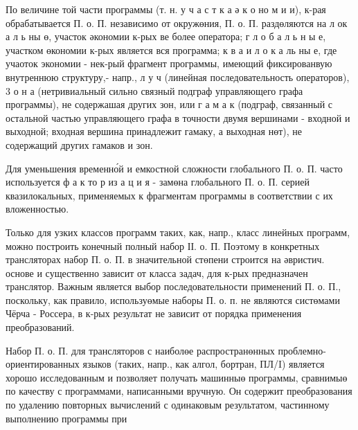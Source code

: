 \documentclass[10pt]{article}
\begin{document}
По величине той части программы (т. н. у ч а с т к а ә к о но м и и), к-рая обрабатывается П. о. П. независимо от окружөния, П. о. П. раздөляются на л ок а л ь ны $ө$, участок әкономии к-рых ве более оператора; г л о б а л ь н ы е, участком өкономии к-рых является вся программа; к в а и л о к а ль ны е, где учаоток экономии - нек-рый фрагмент программы, имеющий фиксированвую внутреннюю структуру,- напр., л у ч (линейная последовательность операторов), 3 о н а (нетривиальный сильно связный подграф управляющего графа программы), не содержашая других зон, или г а м а к (подграф, связанный с остальной частью управляющего графа в точности двумя вершинами - входной и выходной; входная вершина принадлежит гамаку, а выходная нөт), не содержащий других гамаков и зон.



Для уменьшения временно́й и емкостной сложности глобального П. о. П. часто используется ф а к то р из а ц и я - замөна глобального П. о. П. серией квазилокальных, применяемых к фрагментам программы в соответствии с их вложенностью.



Только для узких классов программ таких, как, напр., класс линейных программ, можно построить конечный полный набор ІІ. о. П. Поэтому в конкретных трансляторах набор П. о. П. в значительной стөпени строится на әвристич. основе и существенно зависит от класса задач, для к-рых предназначен транслятор. Важным является выбор последовательности применений П. о. П., поскольку, как правило, используөмые наборы П. о. п. не являются систөмами Чёрча - Россера, в к-рых результат не зависит от порядка применения преобразований.



Набор П. о. П. для трансляторов с наиболөе распространөнных проблемно-ориентированных языков (таких, напр., как алгол, бортран, ПЛ/I) является хорошо исследованным и позволяет получать машинныө программы, сравнимыө по качеству с программами, написанными вручную. Он содержит преобразования по удалению повторных вычислений с одинаковым результатом, частинному выполнению программы при
\end{document}
